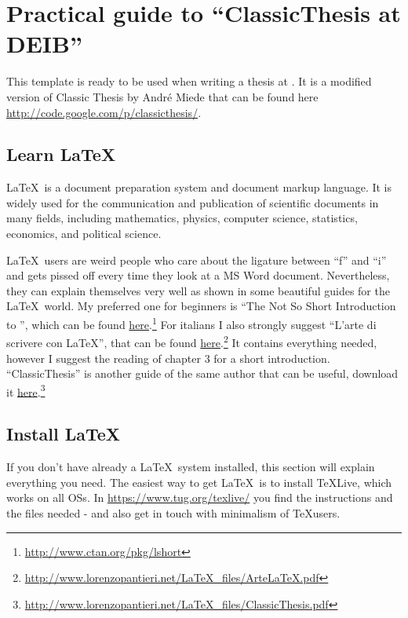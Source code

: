 \chapter{Practical guide to \enquote{ClassicThesis at DEIB}}
\label{chap:conclusion}
This template is ready to be used when writing a thesis at \myDepartment.
It is a modified version of Classic Thesis by Andr\'e Miede that can be found here \url{http://code.google.com/p/classicthesis/}.

\section{Learn \LaTeX}
\LaTeX\ is a document preparation system and document markup language.
It is widely used for the communication and publication of scientific documents in many fields, including mathematics, physics, computer science, statistics, economics, and political science.

\LaTeX\ users are weird people who care about the ligature between \enquote{f} and \enquote{i} and gets pissed off every time they look at a MS Word document.
Nevertheless, they can explain themselves very well as shown in some beautiful guides for the \LaTeX\ world.
My preferred one for beginners is \enquote{The Not So Short Introduction to \LaTeXe}, which can be found \href{http://www.ctan.org/pkg/lshort}{here}.\footnote{\url{http://www.ctan.org/pkg/lshort}}
For italians I also strongly suggest \enquote{L'arte di scrivere con \LaTeX}, that can be found \href{http://www.lorenzopantieri.net/LaTeX_files/ArteLaTeX.pdf}{here}.\footnote{\url{http://www.lorenzopantieri.net/LaTeX_files/ArteLaTeX.pdf}}
It contains everything needed, however I suggest the reading of chapter 3 for a short introduction. \enquote{ClassicThesis} is another guide of the same author that can be useful, download it \href{http://www.lorenzopantieri.net/LaTeX_files/ClassicThesis.pdf}{here}.\footnote{\url{http://www.lorenzopantieri.net/LaTeX_files/ClassicThesis.pdf}}

\section{Install \LaTeX}
If you don't have already a \LaTeX\ system installed, this section will explain everything you need.
The easiest way to get \LaTeX\ is to install TeXLive, which works on all \acp{OS}.
In \url{https://www.tug.org/texlive/} you find the instructions and the files needed - and also get in touch with minimalism of \TeX users. 

